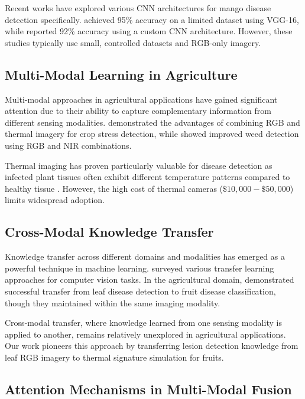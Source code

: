 \documentclass[conference]{IEEEtran}
\begin{document}
Recent works have explored various CNN architectures for mango disease detection specifically. \cite{dubey2022mango} achieved 95\% accuracy on a limited dataset using VGG-16, while \cite{khan2021mango} reported 92\% accuracy using a custom CNN architecture. However, these studies typically use small, controlled datasets and RGB-only imagery.

\subsection{Multi-Modal Learning in Agriculture}

Multi-modal approaches in agricultural applications have gained significant attention due to their ability to capture complementary information from different sensing modalities. \cite{thomas2018benefits} demonstrated the advantages of combining RGB and thermal imagery for crop stress detection, while \cite{gerhards2016advantages} showed improved weed detection using RGB and NIR combinations.

Thermal imaging has proven particularly valuable for disease detection as infected plant tissues often exhibit different temperature patterns compared to healthy tissue \cite{oerke2006thermal}. However, the high cost of thermal cameras ($\$10,000-\$50,000$) limits widespread adoption.

\subsection{Cross-Modal Knowledge Transfer}

Knowledge transfer across different domains and modalities has emerged as a powerful technique in machine learning. \cite{wang2018deep} surveyed various transfer learning approaches for computer vision tasks. In the agricultural domain, \cite{too2019comparative} demonstrated successful transfer from leaf disease detection to fruit disease classification, though they maintained within the same imaging modality.

Cross-modal transfer, where knowledge learned from one sensing modality is applied to another, remains relatively unexplored in agricultural applications. Our work pioneers this approach by transferring lesion detection knowledge from leaf RGB imagery to thermal signature simulation for fruits.

\subsection{Attention Mechanisms in Multi-Modal Fusion}
\end{document}

